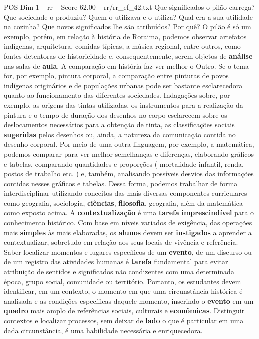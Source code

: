 \begin{textsample}{POS Dim 1 – rr – Score 62.00 – rr/rr\_ef\_42.txt}
Que significados o pilão carrega?
Que sociedade o produziu?
Quem o utilizava e o utiliza?
Qual era a sua utilidade na cozinha?
Que novos significados lhe são atribuídos?
Por quê?
O pilão é só um exemplo, porém, em relação à história de Roraima, podemos observar artefatos indígenas, arquitetura, comidas típicas, a música regional, entre outros, como fontes detentoras de historicidade e, consequentemente, serem objetos de \textbf{análise} nas salas de \textbf{aula}.
A comparação em história faz ver melhor o Outro.
Se o tema for, por exemplo, pintura corporal, a comparação entre pinturas de povos indígenas originários e de populações urbanas pode ser bastante esclarecedora quanto ao funcionamento das diferentes sociedades.
Indagações sobre, por exemplo, as origens das tintas utilizadas, os instrumentos para a realização da pintura e o tempo de duração dos desenhos no corpo esclarecem sobre os deslocamentos necessários para a obtenção de tinta, as classificações sociais \textbf{sugeridas} pelos desenhos ou, ainda, a natureza da comunicação contida no desenho corporal.
Por meio de uma outra linguagem, por exemplo, a matemática, podemos comparar para ver melhor semelhanças e diferenças, elaborando gráficos e tabelas, comparando quantidades e proporções ( mortalidade infantil, renda, postos de trabalho etc. ) e, também, analisando possíveis desvios das informações contidas nesses gráficos e tabelas.
Dessa forma, podemos trabalhar de forma interdisciplinar utilizando conceitos das mais diversas componentes curriculares como geografia, sociologia, \textbf{ciências}, \textbf{filosofia}, geografia, além da matemática como exposto acima.
A \textbf{contextualização} é uma \textbf{tarefa} \textbf{imprescindível} para o conhecimento histórico.
Com base em níveis variados de exigência, das operações mais \textbf{simples} às mais elaboradas, os \textbf{alunos} devem ser \textbf{instigados} a aprender a contextualizar, sobretudo em relação aos seus locais de vivência e referência.
Saber localizar momentos e lugares específicos de um \textbf{evento}, de um discurso ou de um registro das atividades humanas é \textbf{tarefa} fundamental para evitar atribuição de sentidos e significados não condizentes com uma determinada época, grupo social, comunidade ou território.
Portanto, os estudantes devem identificar, em um contexto, o momento em que uma circunstância histórica é analisada e as condições específicas daquele momento, inserindo o \textbf{evento} em um \textbf{quadro} mais amplo de referências sociais, culturais e \textbf{econômicas}.
Distinguir contextos e localizar processos, sem deixar de \textbf{lado} o que é particular em uma dada circunstância, é uma habilidade necessária e enriquecedora.

\end{textsample}
